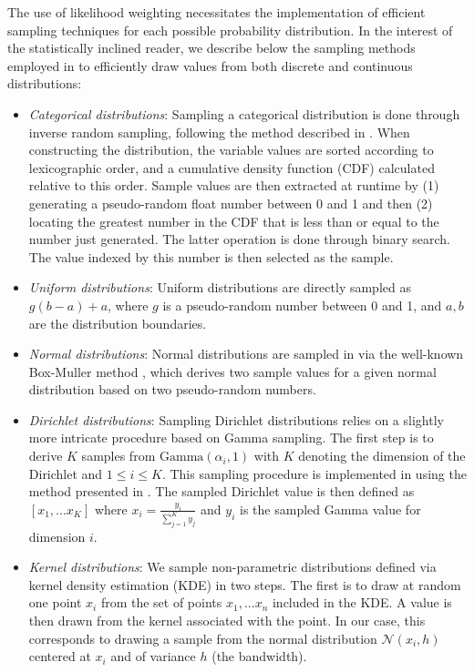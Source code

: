 The use of likelihood weighting necessitates the implementation of efficient sampling techniques for each possible probability distribution.  In the interest of the statistically inclined reader, we describe below the sampling methods employed in \opendial{} to efficiently draw values from both discrete and continuous distributions:
\begin{itemize}
\item \textit{Categorical distributions}:  Sampling a categorical distribution is done through inverse random sampling, following the method described in \cite[][p. 489]{Koller+Friedman:09}. When constructing the distribution, the variable values are sorted according to lexicographic order, and a cumulative density function (CDF) calculated relative to this order.  Sample values are then extracted at runtime by (1) generating a pseudo-random float number between 0 and 1 and then (2) locating the greatest number in the CDF that is less than or equal to the number just generated.  The latter operation is done through binary search. The value indexed by this number is then selected as the sample.
\item \textit{Uniform distributions}:  Uniform distributions are directly sampled as $g (b-a) + a$, where $g$ is a pseudo-random number between 0 and 1, and $a,b$ are the distribution boundaries.

\item \textit{Normal distributions}:  Normal distributions are sampled in \opendial{} via the well-known Box-Muller method \citep{rBOX58a}, which derives two sample values for a given normal distribution based on two pseudo-random numbers.

\item \textit{Dirichlet distributions}:  Sampling Dirichlet distributions relies on a slightly more intricate procedure based on Gamma sampling.   The first step is to derive $K$ samples from $\mathrm{Gamma} (\alpha_i, 1)$ with $K$ denoting the dimension of the Dirichlet and $1 \leq i \leq K$.  This sampling procedure is implemented in \opendial{} using the method presented in \cite{cheng1979}.  The sampled Dirichlet value is then defined as $[x_1,...x_K]$ where $x_i = \frac{y_i}{\sum_{j=1}^K y_j}$ and $y_i$ is the sampled Gamma value for dimension $i$.
\item \textit{Kernel distributions}:  We sample non-parametric distributions defined via kernel density estimation (KDE) in two steps. The first is to draw at random one point $x_i$ from the set of points $x_1,...x_n$ included in the KDE. A value is then drawn from the kernel associated with the point. In our case, this corresponds to drawing a sample from the normal distribution $\mathcal{N}(x_i,h)$ centered at $x_i$ and of variance $h$ (the bandwidth). 
\end{itemize}

